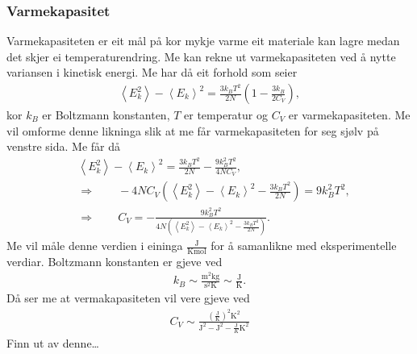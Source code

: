 \documentclass[12pt, a4paper]{article}
\theoremstyle{definition}
\newcommand{\lla}{\left \langle}
\newcommand{\rra}{\right \rangle}
\begin{document}
        \subsubsection*{Varmekapasitet}
            Varmekapasiteten er eit mål på kor mykje varme eit materiale kan lagre medan det skjer ei temperaturendring. Me kan rekne ut varmekapasiteten ved å nytte variansen 
            i kinetisk energi. Me har då eit forhold som seier
            \begin{align*}
                \lla E_k^2 \rra - \lla E_k \rra^2 = \frac{3k_BT^2}{2N}\left( 1 - \frac{3k_B}{2C_V} \right),
            \end{align*}
            kor $k_B$ er Boltzmann konstanten, $T$ er temperatur og $C_V$ er varmekapasiteten. Me vil omforme denne likninga slik at me får varmekapasiteten for seg sjølv på 
            venstre sida. Me får då
            \begin{align*}
                &\lla E_k^2 \rra - \lla E_k \rra^2 = \frac{3k_BT^2}{2N} - \frac{9k_B^2T^2}{4NC_V}, \\
                &\Rightarrow \qquad -4NC_V\left( \lla E_k^2 \rra - \lla E_k \rra^2 -\frac{3k_BT^2}{2N}\right) = 9k_B^2T^2, \\
                &\Rightarrow \qquad C_V = -\frac{9k_B^2T^2}{4N\left( \lla E_k^2 \rra - \lla E_k \rra^2 -\frac{3k_BT^2}{2N}\right)}.
            \end{align*}
            Me vil måle denne verdien i eininga $\frac{\text{J}}{\text{Kmol}}$ for å samanlikne med eksperimentelle verdiar. Boltzmann konstanten er gjeve ved
            \begin{align*}
                k_B \sim \frac{\text{m}^2\text{kg}}{\text{s}^2\text{K}} \sim \frac{\text{J}}{\text{K}}.
            \end{align*}
            Då ser me at vermakapasiteten vil vere gjeve ved
            \begin{align*}
                C_V \sim \frac{\left( \frac{\text{J}}{\text{K}} \right)^2\text{K}^2}{\text{J}^2 - \text{J}^2 - \frac{\text{J}}{K}\text{K}^2}
            \end{align*}
            Finn ut av denne\dots
\end{document}
